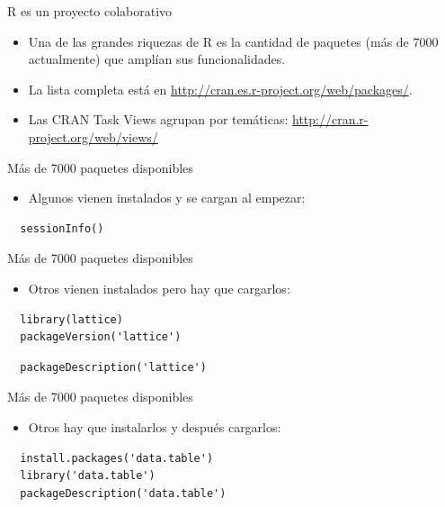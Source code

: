 \documentclass[xcolor={usenames,svgnames,dvipsnames}]{beamer}
\begin{document}
\begin{frame}[label=sec-1-2-6]{R es un proyecto colaborativo}
\begin{itemize}
\item Una de las grandes riquezas de R es la cantidad de paquetes (más
de 7000 actualmente) que amplían sus funcionalidades.
\item La lista completa está en \url{http://cran.es.r-project.org/web/packages/}.
\item Las CRAN Task Views agrupan por temáticas:
\url{http://cran.r-project.org/web/views/}
\end{itemize}
\end{frame}

\begin{frame}[fragile,label=sec-1-2-7]{Más de 7000 paquetes disponibles}
 \begin{itemize}
\item Algunos vienen instalados y se cargan al empezar:
\end{itemize}
\lstset{language=R,label= ,caption= ,numbers=none}
\begin{lstlisting}
  sessionInfo()
\end{lstlisting}
\end{frame}
\begin{frame}[fragile,label=sec-1-2-8]{Más de 7000 paquetes disponibles}
 \begin{itemize}
\item Otros vienen instalados pero hay que cargarlos:
\end{itemize}
\lstset{language=R,label= ,caption= ,numbers=none}
\begin{lstlisting}
  library(lattice)
  packageVersion('lattice')
\end{lstlisting}
\lstset{language=R,label= ,caption= ,numbers=none}
\begin{lstlisting}
  packageDescription('lattice')
\end{lstlisting}
\end{frame}

\begin{frame}[fragile,label=sec-1-2-9]{Más de 7000 paquetes disponibles}
 \begin{itemize}
\item Otros hay que instalarlos y después cargarlos:
\end{itemize}
\lstset{language=R,label= ,caption= ,numbers=none}
\begin{lstlisting}
  install.packages('data.table')
  library('data.table')
  packageDescription('data.table')
\end{lstlisting}
\end{frame}
\end{document}
